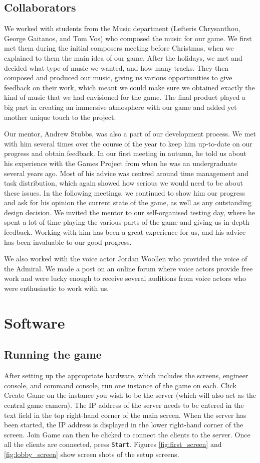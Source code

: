 \documentclass[a4paper,11pt]{article}
\begin{document}
\subsection{Collaborators}
We worked with students from the Music department (Lefteris Chrysanthou, George Gaitanos, and Tom Vos) who composed the music for our game. We first met them during the initial composers meeting before Christmas, when we explained to them the main idea of our game. After the holidays, we met and decided what type of music we wanted, and how many tracks. They then composed and produced our music, giving us various opportunities to give feedback on their work, which meant we could make sure we obtained exactly the kind of music that we had envisioned for the game. The final product played a big part in creating an immersive atmosphere with our game and added yet another unique touch to the project.

Our mentor, Andrew Stubbs, was also a part of our development process. We met with him several times over the course of the year to keep him up-to-date on our progress and obtain feedback. In our first meeting in autumn, he told us about his experience with the Games Project from when he was an undergraduate several years ago. Most of his advice was centred around time management and task distribution, which again showed how serious we would need to be about these issues. In the following meetings, we continued to show him our progress and ask for his opinion the current state of the game, as well as any outstanding design decision. We invited the mentor to our self-organised testing day, where he spent a lot of time playing the various parts of the game and giving us in-depth feedback. Working with him has been a great experience for us, and his advice has been invaluable to our good progress.

We also worked with the voice actor Jordan Woollen who provided the voice of the Admiral. We made a post on an online forum where voice actors provide free work and were lucky enough to receive several auditions from voice actors who were enthusiastic to work with us.

\section{Software}

\subsection{Running the game}
After setting up the appropriate hardware, which includes the screens, engineer console, and command console, run one instance of the game on each. Click Create Game on the instance you wish to be the server (which will also act as the central game camera). The IP address of the server needs to be entered in the text field in the top right-hand corner of the main screen. When the server has been started, the IP address is displayed in the lower right-hand corner of the screen. Join Game can then be clicked to connect the clients to the server. Once all the clients are connected, press \texttt{Start}. Figures \ref{fig:first_screen} and \ref{fig:lobby_screen} show screen shots of the setup screens.
\end{document}
